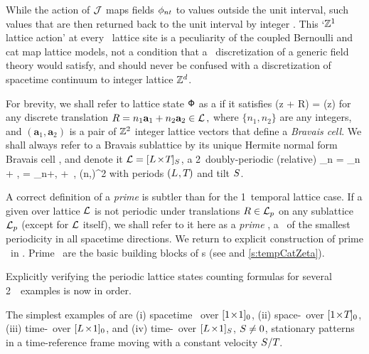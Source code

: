 While the action of {\jacobianOrb} ${\mathcal{J}}$  maps
fields $\phi_{nt}$ to values outside the unit interval, such values
that are then returned back to the  unit interval by integer
. This `$\mathbb{Z}^1$ lattice action' at every \spt\ lattice site
is a peculiarity of the coupled Bernoulli and cat map lattice models, not
a condition that a \spt\ discretization of a generic field theory would
satisfy, and should never be confused with a discretization of spacetime
continuum to integer lattice $\mathbb{Z}^d$.



For brevity, we shall refer to lattice state $\mathsf{\Phi}$ as a
\emph{\twot} if it satisfies
\beq
\Xx({z} + {R}) = \Xx({z})
for any discrete translation
\(
{R} =n_{1}\mathbf{a}_{1}+n_{2}\mathbf{a}_{2}
\in \mathcal{L}
\,,
\)
where $\{n_{1},n_{2}\}$ are any integers, and
$(\mathbf{a}_{1},\mathbf{a}_{2})$ is a pair of $\mathbb{Z}^2$ integer
lattice vectors that define a \emph{Bravais cell}. We shall always refer
to a Bravais sublattice  by its unique {Hermite normal form} {Bravais
cell}  , and denote it $\mathcal{L}={[{L_{}}\!\times\!{T_{}}]_{S_{}}}$,
a 2\dmn\ doubly-periodic
(relative) \emph{\twot}
\beq
\ssp_{n\zeit} = \ssp_{n + \speriod{}, \zeit}
                 = \ssp_{n+\tilt{}, \zeit+ \period{}}
    \,,\qquad
(n,\zeit)\in\integers^2
with periods $({L_{}},{T_{}})$ and tilt ${S_{}}$.

A correct  definition of  a {\em prime} {\twot} is
subtler than for the 1\dmn\ temporal lattice case. If a given {\twot}
over lattice $\mathcal{L}$ is not periodic under translations
\({R}\in\mathcal{L}_p\) on any sublattice $\mathcal{L}_p$ (except for $\mathcal{L}$
itself), we shall refer to it here as a \emph{prime {\twot}}, a \po\ of
the smallest periodicity in all spacetime directions.
We return to explicit construction of prime \twots\ in .
Prime \twots\ are the basic building blocks of \tzeta s (see
 and \ref{s:tempCatZeta}).



Explicitly verifying the periodic lattice states counting formulas for
several 2\dmn\ \catlatt\ examples is now in order.

The simplest examples of {\twots} are
(i) spacetime \eqva\ over ${[1\!\times\!1]_{0}}$,
(ii) space-\eqva\ over ${[1\!\times\!{T_{}}]_{0}}$,
(iii) time-\eqva\  over ${[{L_{}}\!\times\!1]_{0}}$,
and
(iv) time-\reqva\ over ${[{L_{}}\!\times\!1]_{{S_{}}}}$,  ${S_{}}\neq0$,
stationary patterns in a time-reference frame moving with a constant
velocity ${S_{}}/{T_{}}$.

